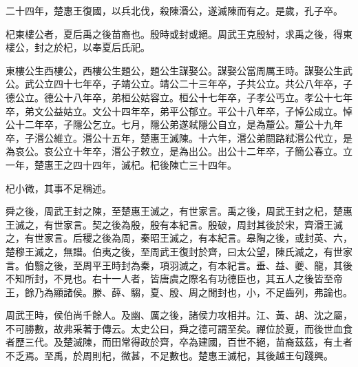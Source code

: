 二十四年，楚惠王復國，以兵北伐，殺陳湣公，遂滅陳而有之。是歲，孔子卒。

杞東樓公者，夏后禹之後苗裔也。殷時或封或絕。周武王克殷紂，求禹之後，得東樓公，封之於杞，以奉夏后氏祀。

東樓公生西樓公，西樓公生題公，題公生謀娶公。謀娶公當周厲王時。謀娶公生武公。武公立四十七年卒，子靖公立。靖公二十三年卒，子共公立。共公八年卒，子德公立。德公十八年卒，弟桓公姑容立。桓公十七年卒，子孝公丐立。孝公十七年卒，弟文公益姑立。文公十四年卒，弟平公郁立。平公十八年卒，子悼公成立。悼公十二年卒，子隱公乞立。七月，隱公弟遂弒隱公自立，是為釐公。釐公十九年卒，子湣公維立。湣公十五年，楚惠王滅陳。十六年，湣公弟閼路弒湣公代立，是為哀公。哀公立十年卒，湣公子敕立，是為出公。出公十二年卒，子簡公春立。立一年，楚惠王之四十四年，滅杞。杞後陳亡三十四年。

杞小微，其事不足稱述。

舜之後，周武王封之陳，至楚惠王滅之，有世家言。禹之後，周武王封之杞，楚惠王滅之，有世家言。契之後為殷，殷有本紀言。殷破，周封其後於宋，齊湣王滅之，有世家言。后稷之後為周，秦昭王滅之，有本紀言。皋陶之後，或封英、六，楚穆王滅之，無譜。伯夷之後，至周武王復封於齊，曰太公望，陳氏滅之，有世家言。伯翳之後，至周平王時封為秦，項羽滅之，有本紀言。垂、益、夔、龍，其後不知所封，不見也。右十一人者，皆唐虞之際名有功德臣也，其五人之後皆至帝王，餘乃為顯諸侯。滕、薛、騶，夏、殷、周之閒封也，小，不足齒列，弗論也。

周武王時，侯伯尚千餘人。及幽、厲之後，諸侯力攻相并。江、黃、胡、沈之屬，不可勝數，故弗采著于傳云。太史公曰，舜之德可謂至矣。禪位於夏，而後世血食者歷三代。及楚滅陳，而田常得政於齊，卒為建國，百世不絕，苗裔茲茲，有土者不乏焉。至禹，於周則杞，微甚，不足數也。楚惠王滅杞，其後越王句踐興。